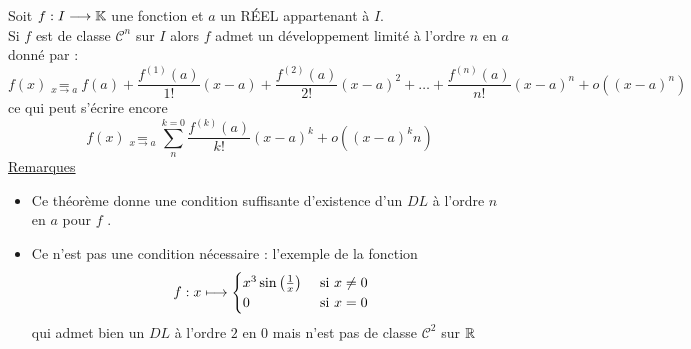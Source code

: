 \begin{theo}
    Soit \(f : I \longrightarrow  \mathbb{K}\) une fonction et \(a\) un RÉEL appartenant à \(I\).\\
    Si \(f\) est de classe \(\mathcal{C}^n\) sur \(I\) alors \(f\) admet un développement limité à l’ordre \(n\) en \(a\) donné par :
    \[f (x) \underset{x\to a}{=} f (a) + \frac{f^{(1)}(a)}{1!} (x - a) + \frac{f^{(2)}(a)}{2!} (x - a)^2 + \dots + \frac{f^{(n)}(a)}{n!} (x - a)^n + o ((x - a)^n)\]
    ce qui peut s’écrire encore
    \[f (x) \underset{x\to a}{=} \sum_{n}^{k=0}\frac{f ^{(k)}(a)}{k!} (x - a)^k + o ((x - a)^kn) \]
    \underline{Remarques}\\
    \begin{itemize}
    \item Ce théorème donne une condition suffisante d’existence d’un \(DL\) à l’ordre \(n\) en \(a\) pour \(f\) .
    \item Ce n’est pas une condition nécessaire : \cf l’exemple de la fonction 
    \[f : x \longmapsto \begin{cases}
        x^3 \sin\left(\frac{1}{x}\right) &\text{ si }x\neq 0\\
        0 &\text{ si }x = 0 \end{cases}\]
    qui admet bien un \(DL\) à l’ordre \(2\) en \(0\) mais n’est pas de classe \(\mathcal{C}^2\) sur \(\mathbb{R}\)
    \end{itemize}

\end{theo}


